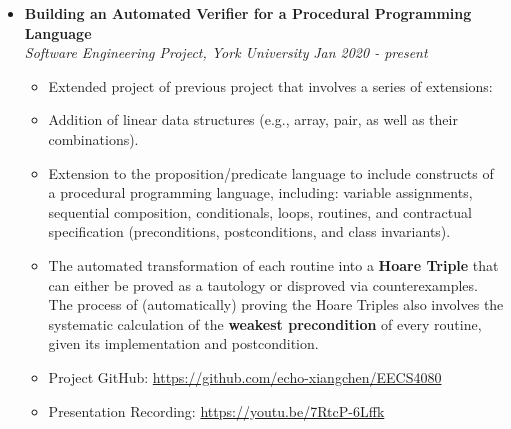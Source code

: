 \documentclass[a4paper,10pt,titlepage]{article}
\begin{document}
\begin{itemize}%
	\item {\bf Building an Automated Verifier for a Procedural Programming Language}
	\\\emph {Software Engineering Project, York University} {\hfill \emph{Jan 2020 - present}}
	\begin{itemize}%
		\item Extended project of previous project that involves a series of extensions:
		\item Addition of linear data structures (e.g., array, pair, as well as their combinations).
		\item Extension to the proposition/predicate language to include constructs of a procedural programming language, including: variable assignments, sequential composition, conditionals, loops, routines, and contractual specification (preconditions, postconditions, and class invariants).
		\item The automated transformation of each routine into a {\bf Hoare Triple} that can either be proved as a tautology or disproved via counterexamples. The process of (automatically) proving the Hoare Triples also involves the systematic calculation of the {\bf weakest precondition} of every routine, given its implementation and postcondition.
		\item Project GitHub: \url{https://github.com/echo-xiangchen/EECS4080}
		\item Presentation Recording: \url{https://youtu.be/7RtcP-6Lffk}
\end{itemize}
\end{itemize}
\end{document}
